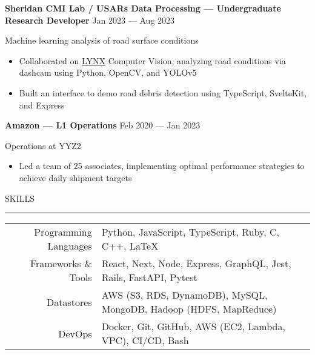 \documentclass[9pt]{extarticle}
\begin{document}
\begin{adjustwidth}{10pt}{10pt}
	\vspace{-10pt}

	\textcolor{imptextblack}{\textbf{\large Sheridan CMI Lab / USARs Data Processing — Undergraduate Research Developer}} \hfill Jan 2023 — Aug 2023
	
	Machine learning analysis of road surface conditions
	
	\begin{itemize}[topsep=0pt]
		\item Collaborated on \href{https://github.com/Lynx-Data-Processing}{LYNX} Computer Vision, analyzing road conditions via dashcam using Python, OpenCV, and YOLOv5
		\item Built an interface to demo road debris detection using TypeScript, SvelteKit, and Express
	\end{itemize}
	
	\vspace{5pt}
	\textcolor{imptextblack}{\textbf{\large Amazon — L1 Operations}} \hfill Feb 2020 — Jan 2023
	
	Operations at YYZ2
	
	\begin{itemize}[topsep=0pt]
		\item Led a team of \textcolor{imptextblack}{25} associates, implementing optimal performance strategies to achieve daily shipment targets
	\end{itemize}
\end{adjustwidth}


\vspace{5pt}

\begin{adjustwidth}{4pt}{4pt} \large SKILLS \end{adjustwidth}
\rule[8pt]{\linewidth}{0.4pt}

\begin{adjustwidth}{10pt}{10pt}
	\vspace{-5pt}

	\begin{tabular}{ r l }
	 	\textcolor{imptextblack}{Programming Languages} & Python, JavaScript, TypeScript, Ruby, C, C++, \LaTeX \\ 
	 	\textcolor{imptextblack}{Frameworks \& Tools} & React, Next, Node, Express, GraphQL, Jest, Rails, FastAPI, Pytest \\  
	 	\textcolor{imptextblack}{Datastores} & AWS (S3, RDS, DynamoDB), MySQL, MongoDB, Hadoop (HDFS, MapReduce) \\  
	 	\textcolor{imptextblack}{DevOps} & Docker, Git, GitHub, AWS (EC2, Lambda, VPC), CI/CD, Bash \\  
	\end{tabular}
\end{adjustwidth}
\end{document}
